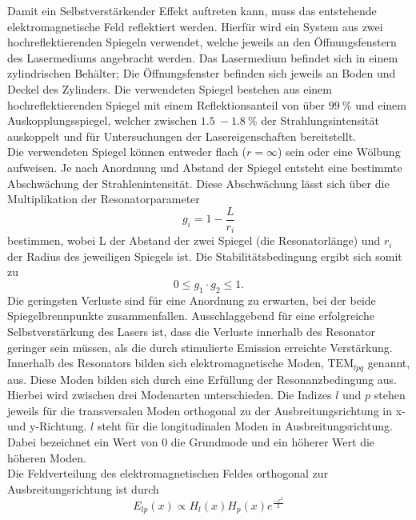Damit ein Selbstverstärkender Effekt auftreten kann, muss das entstehende elektromagnetische Feld reflektiert werden. Hierfür wird ein System aus zwei
hochreflektierenden Spiegeln verwendet, welche jeweils an den Öffnungsfenstern des Lasermediums angebracht werden. Das Lasermedium befindet sich in einem 
zylindrischen Behälter; Die Öffnungsfenster befinden sich jeweils an Boden und Deckel des Zylinders. Die verwendeten Spiegel bestehen aus einem hochreflektierenden
Spiegel mit einem Reflektionsanteil von über $\qty{99}{\%}$ und einem Auskopplungsspiegel, welcher zwischen $\qty{1.5}{}-\qty{1.8}{\%}$ der Strahlungsintensität
auskoppelt und für Untersuchungen der Lasereigenschaften bereitstellt.\\
Die verwendeten Spiegel können entweder flach ($r = \infty$) sein oder eine Wölbung aufweisen. Je nach Anordnung und Abstand der Spiegel entsteht
eine bestimmte Abschwächung der Strahlenintensität. Diese Abschwächung lässt sich über die Multiplikation der Resonatorparameter
\begin{equation}
    g_i = 1 - \frac{L}{r_i}
\end{equation}
bestimmen, wobei L der Abstand der zwei Spiegel (die Resonatorlänge) und $r_i$ der Radius des jeweiligen Spiegels ist. Die Stabilitätsbedingung ergibt sich somit zu 
\begin{equation}
    \label{eqn:stabil}
    0 \leq g_1 \cdot g_2 \leq 1.
\end{equation}
Die geringsten Verluste sind für eine Anordnung zu erwarten, bei der beide Spiegelbrennpunkte zusammenfallen. Ausschlaggebend für eine erfolgreiche Selbstverstärkung
des Lasers ist, dass die Verluste innerhalb des Resonator geringer sein müssen, als die durch stimulierte Emission erreichte Verstärkung.\\
Innerhalb des Resonators bilden sich elektromagnetische Moden, $\mathrm{TEM}_{lpq}$ genannt, aus. Diese Moden bilden sich durch eine Erfüllung der Resonanzbedingung aus.
Hierbei wird zwischen drei Modenarten unterschieden. Die Indizes $l$ und $p$ stehen jeweils für die transversalen Moden orthogonal zu der Ausbreitungsrichtung in x-
und y-Richtung. $l$ steht für die longitudinalen Moden in Ausbreitungsrichtung. Dabei bezeichnet ein Wert von $0$ die Grundmode und ein höherer Wert die höheren Moden.\\
Die Feldverteilung des elektromagnetischen Feldes orthogonal zur Ausbreitungsrichtung ist durch
\begin{equation}
    E_{lp}(x) \propto H_l(x) H_p(x) e^{\frac{-x^2}{2}}
\end{equation}

